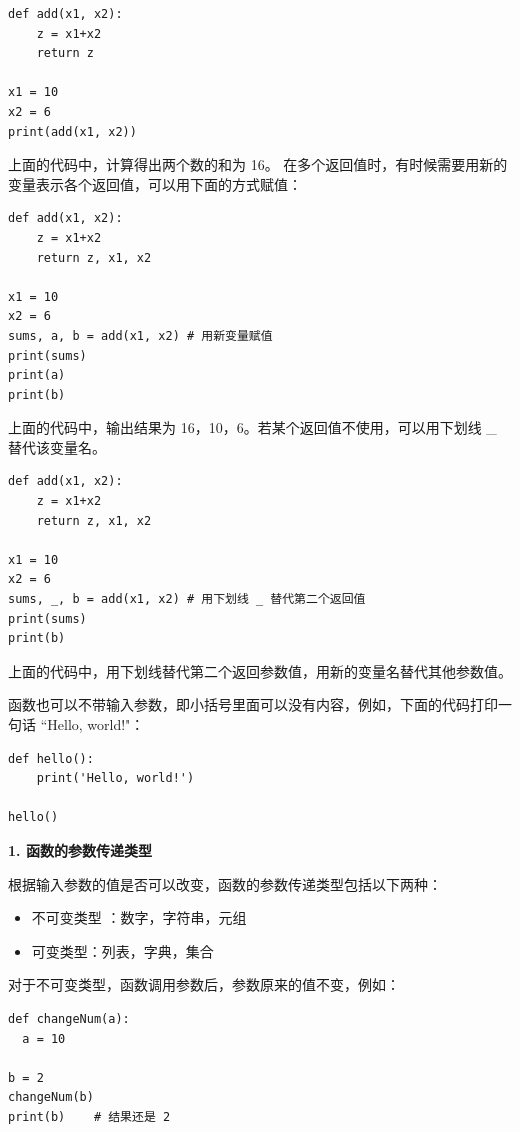 \begin{lstlisting}[Language=Python]
def add(x1, x2):
    z = x1+x2
    return z

x1 = 10
x2 = 6
print(add(x1, x2))
\end{lstlisting}

上面的代码中，计算得出两个数的和为 16。 在多个返回值时，有时候需要用新的变量表示各个返回值，可以用下面的方式赋值：

\begin{lstlisting}[Language=Python]
def add(x1, x2):
    z = x1+x2
    return z, x1, x2

x1 = 10
x2 = 6
sums, a, b = add(x1, x2) # 用新变量赋值
print(sums)
print(a)
print(b)
\end{lstlisting}


上面的代码中，输出结果为 16，10，6。若某个返回值不使用，可以用下划线 \_ 替代该变量名。

\begin{lstlisting}[Language=Python]
def add(x1, x2):
    z = x1+x2
    return z, x1, x2

x1 = 10
x2 = 6
sums, _, b = add(x1, x2) # 用下划线 _ 替代第二个返回值
print(sums)
print(b)
\end{lstlisting}

上面的代码中，用下划线替代第二个返回参数值，用新的变量名替代其他参数值。

函数也可以不带输入参数，即小括号里面可以没有内容，例如，下面的代码打印一句话 ``Hello, world!"：
\begin{lstlisting}[Language=Python]
def hello():
    print('Hello, world!')

hello()
\end{lstlisting}

\noindent\textbf{1. 函数的参数传递类型}

根据输入参数的值是否可以改变，函数的参数传递类型包括以下两种：

\begin{itemize}
  \item 不可变类型
：数字，字符串，元组

\item 可变类型：列表，字典，集合

\end{itemize}

对于不可变类型，函数调用参数后，参数原来的值不变，例如：

\begin{lstlisting}[Language=Python]
def changeNum(a):
  a = 10

b = 2
changeNum(b)
print(b)    # 结果还是 2

\end{lstlisting}


